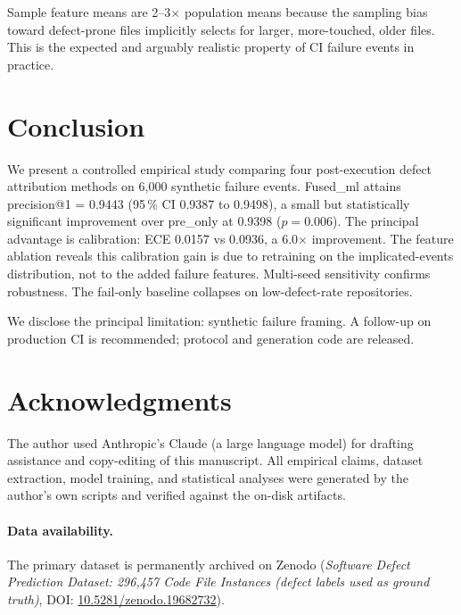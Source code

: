 \documentclass[sigconf,nonacm,review]{acmart}
\begin{document}
Sample feature means are 2--3$\times$ population means because the
sampling bias toward defect-prone files implicitly selects for
larger, more-touched, older files. This is the expected and
arguably realistic property of CI failure events in practice.

\section{Conclusion}
\label{sec:conclusion}

We present a controlled empirical study comparing four
post-execution defect attribution methods on 6{,}000 synthetic
failure events. Fused\_ml attains precision@1 = 0.9443 (95\,\% CI
0.9387 to 0.9498), a small but statistically significant
improvement over pre\_only at 0.9398 ($p = 0.006$). The principal
advantage is calibration: ECE 0.0157 vs 0.0936, a 6.0$\times$
improvement. The feature ablation reveals this calibration gain is
due to retraining on the implicated-events distribution, not to the
added failure features. Multi-seed sensitivity confirms robustness.
The fail-only baseline collapses on low-defect-rate repositories.

We disclose the principal limitation: synthetic failure framing.
A follow-up on production CI is recommended; protocol and
generation code are released.


\section*{Acknowledgments}
The author used Anthropic's Claude (a large language model) for drafting assistance and copy-editing of this manuscript. All empirical claims, dataset extraction, model training, and statistical analyses were generated by the author's own scripts and verified against the on-disk artifacts.

\paragraph*{Data availability.} The primary dataset is permanently archived on Zenodo (\textit{Software Defect Prediction Dataset: 296,457 Code File Instances (defect labels used as ground truth)}, DOI: \href{https://doi.org/10.5281/zenodo.19682732}{10.5281/zenodo.19682732}).



\end{document}
